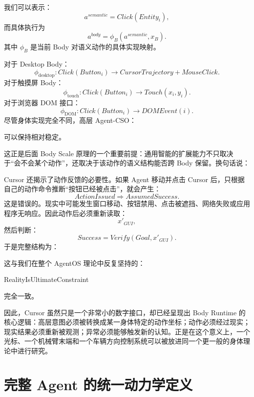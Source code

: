 我们可以表示：
\[
a^{semantic}
=
Click(Entity_i),
\]
而具体执行为
\[
a^{body}
=
\phi_B
\left(
a^{semantic},
x_B
\right).
\]
其中 $\phi_B$ 是当前 Body 对语义动作的具体实现映射。

对于 Desktop Body：
\[
\phi_{\mathrm{desktop}}
:
Click(Button_i)
\rightarrow
CursorTrajectory+MouseClick.
\]
对于触摸屏 Body：
\[
\phi_{\mathrm{touch}}
:
Click(Button_i)
\rightarrow
Touch(x_i,y_i).
\]
对于浏览器 DOM 接口：
\[
\phi_{\mathrm{DOM}}
:
Click(Button_i)
\rightarrow
DOMEvent(i).
\]
尽管身体实现完全不同，高层 Agent-CSO：
\begin{statementbox}
\centering
{}
\end{statementbox}
可以保持相对稳定。

这正是后面 Body Scale 原理的一个重要前提：通用智能的扩展能力不只取决于“会不会某个动作”，还取决于该动作的语义结构能否跨 Body 保留。换句话说：
\begin{statementbox}
\centering
{}
\end{statementbox}

Cursor 还揭示了动作反馈的必要性。如果 Agent 移动并点击 Cursor 后，只根据自己的动作命令推断“按钮已经被点击”，就会产生：
\[
ActionIssued
\Rightarrow
AssumedSuccess.
\]
这是错误的。现实中可能发生窗口移动、按钮禁用、点击被遮挡、网络失败或应用程序无响应。因此动作后必须重新读取：
\[
x'_{GUI},
\]
然后判断：
\[
Success
=
Verify(
Goal,
x'_{GUI}
).
\]
于是完整结构为：
\begin{statementbox}
\centering
{}
\end{statementbox}

这与我们在整个 AgentOS 理论中反复坚持的：
\begin{statementbox}
RealityIsUltimateConstraint
\end{statementbox}
完全一致。

因此，Cursor 虽然只是一个非常小的数字接口，却已经呈现出 Body Runtime 的核心逻辑：高层意图必须被转换成某一身体特定的动作坐标；动作必须经过现实；现实结果必须重新被观测；异常必须能够触发新的认知。正是在这个意义上，一个光标、一个机械臂末端和一个车辆方向控制系统可以被放进同一个更一般的身体理论中进行研究。

\section{完整 Agent 的统一动力学定义}

